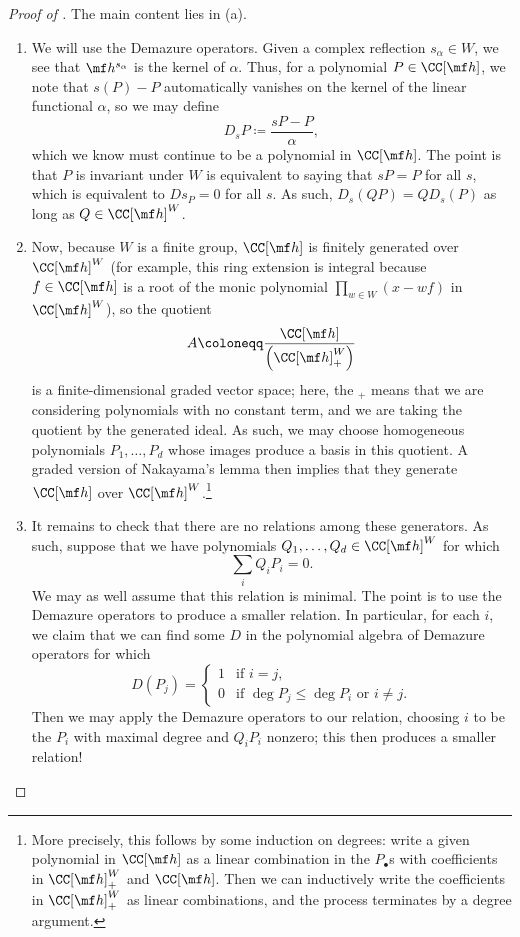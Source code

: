 \documentclass[../notes.tex]{subfiles}
\begin{document}
\begin{proof}[Proof of ]
	The main content lies in (a).
	\begin{enumerate}
		\item We will use the Demazure operators. Given a complex reflection $s_\alpha\in W$, we see that $\mf h^{s_\alpha}$ is the kernel of $\alpha$. Thus, for a polynomial $P\in\CC[\mf h]$, we note that $s(P)-P$ automatically vanishes on the kernel of the linear functional $\alpha$, so we may define
		\[D_sP\coloneqq\frac{sP-P}\alpha,\]
		which we know must continue to be a polynomial in $\CC[\mf h]$. The point is that $P$ is invariant under $W$ is equivalent to saying that $sP=P$ for all $s$, which is equivalent to $Ds_P=0$ for all $s$. As such, $D_s(QP)=QD_s(P)$ as long as $Q\in\CC[\mf h]^W$.

		\item Now, because $W$ is a finite group, $\CC[\mf h]$ is finitely generated over $\CC[\mf h]^W$ (for example, this ring extension is integral because $f\in\CC[\mf h]$ is a root of the monic polynomial $\prod_{w\in W}(x-wf)$ in $\CC[\mf h]^W$), so the quotient
		\[A\coloneqq\frac{\CC[\mf h]}{\left(\CC[\mf h]_+^W\right)}\]
		is a finite-dimensional graded vector space; here, the $_+$ means that we are considering polynomials with no constant term, and we are taking the quotient by the generated ideal. As such, we may choose homogeneous polynomials $P_1,\ldots,P_d$ whose images produce a basis in this quotient. A graded version of Nakayama's lemma then implies that they generate $\CC[\mf h]$ over $\CC[\mf h]^W$.\footnote{More precisely, this follows by some induction on degrees: write a given polynomial in $\CC[\mf h]$ as a linear combination in the $P_\bullet$s with coefficients in $\CC[\mf h]_+^W$ and $\CC[\mf h]$. Then we can inductively write the coefficients in $\CC[\mf h]_+^W$ as linear combinations, and the process terminates by a degree argument.}
		
		\item It remains to check that there are no relations among these generators. As such, suppose that we have polynomials $Q_1,\ldots,Q_d\in\CC[\mf h]^W$ for which
		\[\sum_iQ_iP_i=0.\]
		We may as well assume that this relation is minimal. The point is to use the Demazure operators to produce a smaller relation. In particular, for each $i$, we claim that we can find some $D$ in the polynomial algebra of Demazure operators for which %
		\[D(P_j)=\begin{cases}
			1 & \text{if }i=j, \\
			0 & \text{if }\deg P_j\le\deg P_i\text{ or }i\ne j.
		\end{cases}\]
		Then we may apply the Demazure operators to our relation, choosing $i$ to be the $P_i$ with maximal degree and $Q_iP_i$ nonzero; this then produces a smaller relation!


\end{enumerate}
\end{proof}
\end{document}
